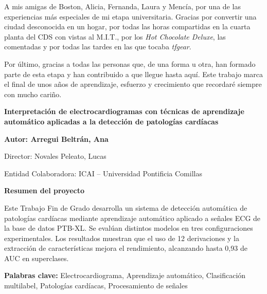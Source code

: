 \documentclass[12pt,a4paper,twoside]{book}
\begin{document}
A mis amigas de Boston, Alicia, Fernanda, Laura y Mencía, por una de las experiencias más especiales de mi etapa universitaria. 
Gracias por convertir una ciudad desconocida en un hogar, por todas las horas compartidas en la cuarta planta del CDS con vistas al M.I.T., por los \textit{Hot Chocolate Deluxe}, las comentadas y por todas las tardes en las que tocaba \textit{tfgear}.

Por último, gracias a todas las personas que, de una forma u otra, han formado parte de esta etapa y han contribuido a que llegue hasta aquí. 
Este trabajo marca el final de unos años de aprendizaje, esfuerzo y crecimiento que recordaré siempre con mucho cariño.


\newpage


	


\cleardoublepage

\noindent \textbf{Interpretación de electrocardiogramas con técnicas de aprendizaje automático aplicadas a la detección de patologías cardíacas}

\vspace{0.3cm}

\noindent \textbf{Autor: Arregui Beltrán, Ana}

\noindent Director: Novales Peleato, Lucas

\noindent Entidad Colaboradora: ICAI -- Universidad Pontificia Comillas

\vspace{0.3cm}

\noindent \large \textbf{Resumen del proyecto}
\vspace{0.3cm}

Este Trabajo Fin de Grado desarrolla un sistema de detección automática de patologías cardíacas mediante aprendizaje automático aplicado a señales ECG de la base de datos PTB-XL. 
Se evalúan distintos modelos en tres configuraciones experimentales. 
Los resultados muestran que el uso de 12 derivaciones y la extracción de características mejora el rendimiento, alcanzando hasta 0,93 de AUC en superclases.
\vspace{0.3cm}

\textbf{Palabras clave:} Electrocardiograma, Aprendizaje automático, Clasificación multilabel, Patologías cardíacas, Procesamiento de señales

\vspace{0.5cm}
\end{document}
